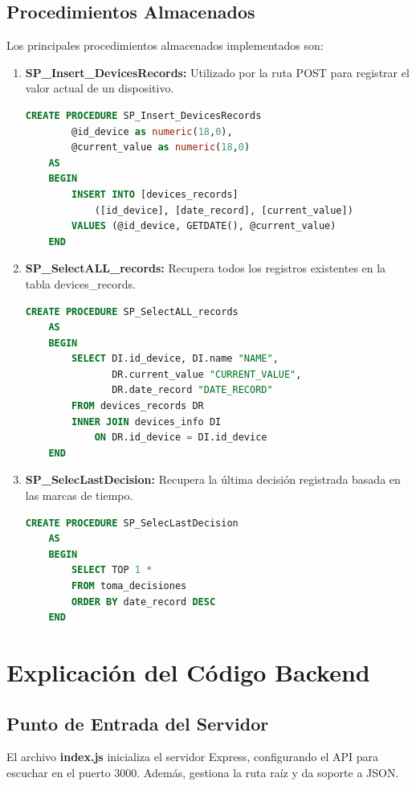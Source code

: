 \documentclass[12pt]{article}
\begin{document}
\subsection{Procedimientos Almacenados}
\noindent Los principales procedimientos almacenados implementados son:

\begin{enumerate}
    \item \textbf{SP\_Insert\_DevicesRecords:} Utilizado por la ruta POST para registrar el valor actual de un dispositivo.
    \begin{lstlisting}[language=SQL]
    CREATE PROCEDURE SP_Insert_DevicesRecords
        @id_device as numeric(18,0),
        @current_value as numeric(18,0)
    AS
    BEGIN
        INSERT INTO [devices_records]
            ([id_device], [date_record], [current_value])
        VALUES (@id_device, GETDATE(), @current_value)
    END
    \end{lstlisting}
    
    \item \textbf{SP\_SelectALL\_records:} Recupera todos los registros existentes en la tabla devices\_records.
    \begin{lstlisting}[language=SQL]
    CREATE PROCEDURE SP_SelectALL_records
    AS
    BEGIN
        SELECT DI.id_device, DI.name "NAME", 
               DR.current_value "CURRENT_VALUE", 
               DR.date_record "DATE_RECORD"
        FROM devices_records DR
        INNER JOIN devices_info DI 
            ON DR.id_device = DI.id_device
    END
    \end{lstlisting}
    
    \item \textbf{SP\_SelecLastDecision:} Recupera la última decisión registrada basada en las marcas de tiempo.
    \begin{lstlisting}[language=SQL]
    CREATE PROCEDURE SP_SelecLastDecision
    AS
    BEGIN
        SELECT TOP 1 *
        FROM toma_decisiones
        ORDER BY date_record DESC
    END
    \end{lstlisting}
\end{enumerate}

\section{Explicación del Código Backend}

\subsection{Punto de Entrada del Servidor}
El archivo \textbf{index.js} inicializa el servidor Express, configurando el API para escuchar en el puerto 3000. Además, gestiona la ruta raíz y da soporte a JSON.
\end{document}

